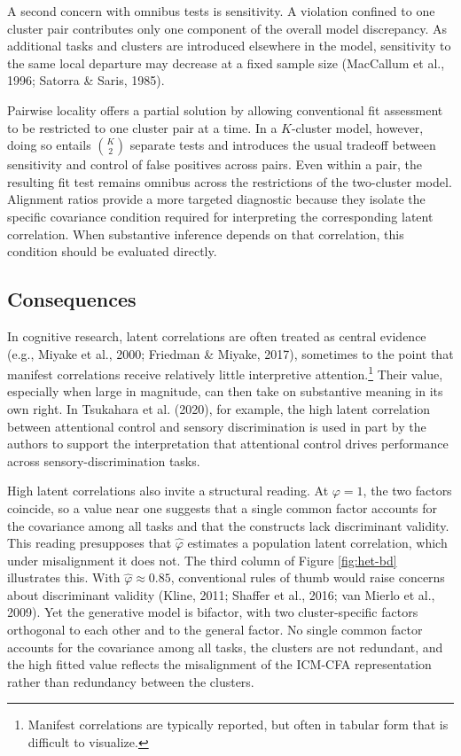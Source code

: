 \documentclass[
  american,
  man,floatsintext]{apa7}
\begin{document}
A second concern with omnibus tests is sensitivity. A violation confined to one cluster pair contributes only one component of the overall model discrepancy. As additional tasks and clusters are introduced elsewhere in the model, sensitivity to the same local departure may decrease at a fixed sample size (MacCallum et al., 1996; Satorra \& Saris, 1985).

Pairwise locality offers a partial solution by allowing conventional fit assessment to be restricted to one cluster pair at a time. In a \(K\)-cluster model, however, doing so entails \(\binom{K}{2}\) separate tests and introduces the usual tradeoff between sensitivity and control of false positives across pairs. Even within a pair, the resulting fit test remains omnibus across the restrictions of the two-cluster model. Alignment ratios provide a more targeted diagnostic because they isolate the specific covariance condition required for interpreting the corresponding latent correlation. When substantive inference depends on that correlation, this condition should be evaluated directly.

\subsection{Consequences}\label{consequences}

In cognitive research, latent correlations are often treated as central evidence (e.g., Miyake et al., 2000; Friedman \& Miyake, 2017), sometimes to the point that manifest correlations receive relatively little interpretive attention.\footnote{Manifest correlations are typically reported, but often in tabular form that is difficult to visualize.} Their value, especially when large in magnitude, can then take on substantive meaning in its own right. In Tsukahara et al. (2020), for example, the high latent correlation between attentional control and sensory discrimination is used in part by the authors to support the interpretation that attentional control drives performance across sensory-discrimination tasks.

High latent correlations also invite a structural reading. At \(\varphi=1\), the two factors coincide, so a value near one suggests that a single common factor accounts for the covariance among all tasks and that the constructs lack discriminant validity. This reading presupposes that \(\widehat{\varphi}\) estimates a population latent correlation, which under misalignment it does not. The third column of Figure \ref{fig:het-bd} illustrates this. With \(\widehat{\varphi}\approx 0.85\), conventional rules of thumb would raise concerns about discriminant validity (Kline, 2011; Shaffer et al., 2016; van Mierlo et al., 2009). Yet the generative model is bifactor, with two cluster-specific factors orthogonal to each other and to the general factor. No single common factor accounts for the covariance among all tasks, the clusters are not redundant, and the high fitted value reflects the misalignment of the ICM-CFA representation rather than redundancy between the clusters.
\end{document}
